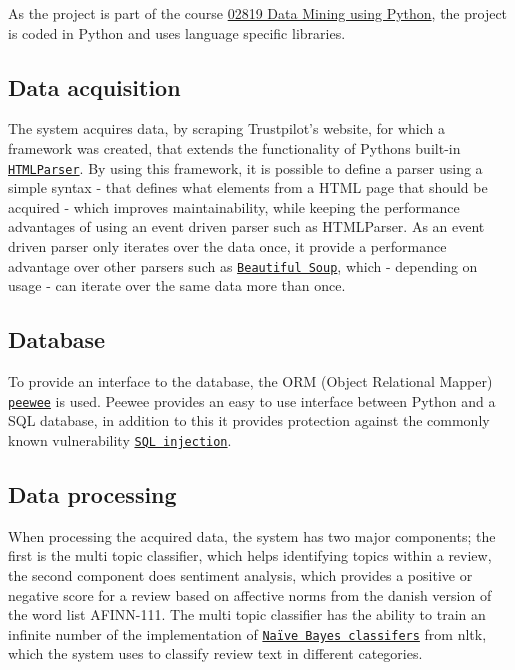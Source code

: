 \documentclass[10pt]{IEEEtran}
\begin{document}
As the project is part of the course \href{http://www.kurser.dtu.dk/02819.aspx?menulanguage=en-GB}{02819 Data Mining using Python}, the project is coded in Python and uses language specific libraries.

\subsection{Data acquisition}
The system acquires data, by scraping Trustpilot's website, for which a framework was created, that extends the functionality of Pythons built-in \href{http://docs.python.org/2/library/htmlparser.html}{\texttt{HTMLParser}}. By using this framework, it is possible to define a parser using a simple syntax - that defines what elements from a HTML page that should be acquired - which improves maintainability, while keeping the performance advantages of using an event driven parser such as HTMLParser. As an event driven parser only iterates over the data once, it provide a performance advantage over other parsers such as \href{http://www.crummy.com/software/BeautifulSoup/}{\texttt{Beautiful Soup}}, which - depending on usage - can iterate over the same data more than once.

\subsection{Database}
To provide an interface to the database, the ORM (Object Relational Mapper) \href{http://peewee.readthedocs.org/en/latest/}{\texttt{peewee}} is used. Peewee provides an easy to use interface between Python and a SQL database, in addition to this it provides protection against the commonly known vulnerability \href{https://www.owasp.org/index.php/Top_10_2013-A1-Injection}{\texttt{SQL injection}}.

\subsection{Data processing}
When processing the acquired data, the system has two major components; the first is the multi topic classifier, which helps identifying topics within a review, the second component does sentiment analysis, which provides a positive or negative score for a review based on affective norms from the danish version of the word list AFINN-111\cite{IMM2011-06010}. The multi topic classifier has the ability to train an infinite number of the implementation of \href{http://nltk.org/api/nltk.classify.html#module-nltk.classify.naivebayes}{\texttt{Naïve Bayes classifers}} from nltk, which the system uses to classify review text in different categories.
\end{document}

